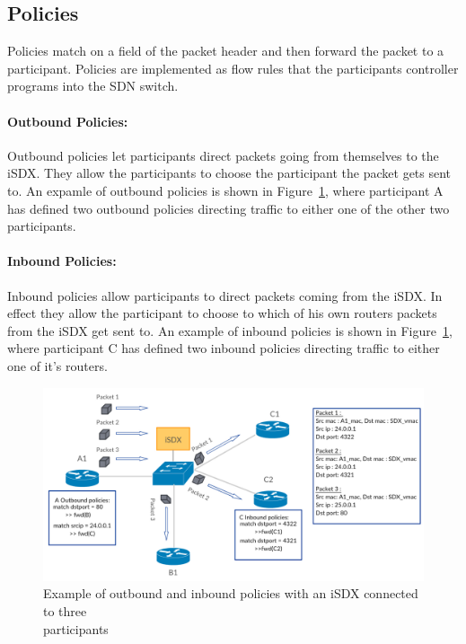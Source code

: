 \subsection{\label{chapter2:iSDX:policies}Policies}
Policies match on a field of the packet header and then forward the packet to a participant. Policies are implemented as flow rules that the participants controller programs into the SDN switch. 
\paragraph{\label{chapter2:iSDX:policies:outbound policies}Outbound Policies:}
Outbound policies let participants direct packets going from themselves to the iSDX. They allow the participants to choose the participant the packet gets sent to. An expamle of outbound policies is shown in Figure~\ref{fig:isdx_policies}, where participant A has defined two outbound policies directing traffic to either one of the other two participants.  

\paragraph{\label{chapter2:iSDX:policies:inbound policies}Inbound Policies:}
Inbound policies allow participants to direct packets coming from the iSDX. In effect they allow the participant to choose to which of his own routers packets from the iSDX get sent to. An example of inbound policies is shown in Figure~\ref{fig:isdx_policies}, where participant C has defined two inbound policies directing traffic to either one of it's routers. 

\begin{figure}[h]
\includegraphics[scale = 0.32]{Figures/bckgrnd_sdx_policies.pdf}
\caption{Example of outbound and inbound policies with an iSDX connected to three \\ participants}
\label{fig:isdx_policies}
\end{figure}
  

